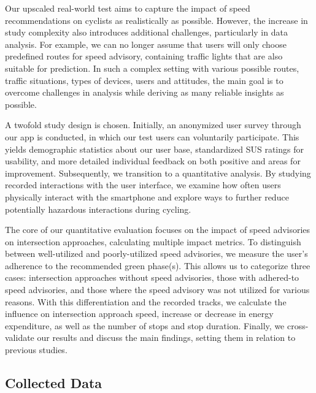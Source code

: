 Our upscaled real-world test aims to capture the impact of speed recommendations on cyclists as realistically as possible. However, the increase in study complexity also introduces additional challenges, particularly in data analysis. For example, we can no longer assume that users will only choose predefined routes for speed advisory, containing traffic lights that are also suitable for prediction. In such a complex setting with various possible routes, traffic situations, types of devices, users and attitudes, the main goal is to overcome challenges in analysis while deriving as many reliable insights as possible. 

A twofold study design is chosen. Initially, an anonymized user survey through our app is conducted, in which our test users can voluntarily participate. This yields demographic statistics about our user base, standardized SUS ratings for usability, and more detailed individual feedback on both positive and areas for improvement. Subsequently, we transition to a quantitative analysis. By studying recorded interactions with the user interface, we examine how often users physically interact with the smartphone and explore ways to further reduce potentially hazardous interactions during cycling.

The core of our quantitative evaluation focuses on the impact of speed advisories on intersection approaches, calculating multiple impact metrics. To distinguish between well-utilized and poorly-utilized speed advisories, we measure the user's adherence to the recommended green phase(s). This allows us to categorize three cases: intersection approaches without speed advisories, those with adhered-to speed advisories, and those where the speed advisory was not utilized for various reasons. With this differentiation and the recorded tracks, we calculate the influence on intersection approach speed, increase or decrease in energy expenditure, as well as the number of stops and stop duration. Finally, we cross-validate our results and discuss the main findings, setting them in relation to previous studies.

\subsection{Collected Data}

